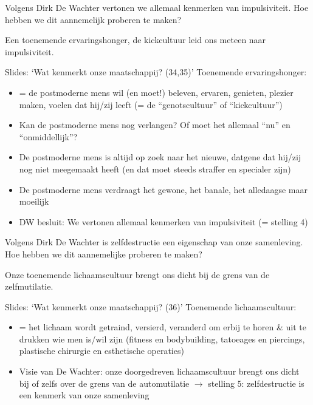 \documentclass[main.tex]{subfiles}
\begin{document}
\begin{examenvraag}
    \begin{vraag}
        Volgens Dirk De Wachter vertonen we allemaal kenmerken van impulsiviteit. Hoe hebben we dit aannemelijk proberen te maken?
    \end{vraag}

    \begin{antwoord}
        Een toenemende ervaringshonger, de kickcultuur leid ons meteen naar impulsiviteit.
        \begin{citaat}{Slides: `Wat kenmerkt onze maatschappij? (34,35)'}
            Toenemende ervaringshonger:
            \begin{itemize}
                \item = de postmoderne mens wil (en moet!) beleven, ervaren, genieten, plezier maken, voelen dat hij/zij leeft (= de “genotscultuur” of “kickcultuur”)
                \item Kan de postmoderne mens nog verlangen? Of moet het allemaal “nu” en “onmiddellijk”?
                \item De postmoderne mens is altijd op zoek naar het nieuwe, datgene dat hij/zij nog niet meegemaakt heeft (en dat moet steeds straffer en specialer zijn)
                \item De postmoderne mens verdraagt het gewone, het banale, het alledaagse maar moeilijk
                \item DW besluit: We vertonen allemaal kenmerken van impulsiviteit (= stelling 4)
            \end{itemize}
        \end{citaat}
    \end{antwoord}
\end{examenvraag}


\begin{examenvraag}
    \begin{vraag}
        Volgens Dirk De Wachter is zelfdestructie een eigenschap van onze samenleving. Hoe hebben we dit aannemelijke proberen te maken?
    \end{vraag}

    \begin{antwoord}
        Onze toenemende lichaamscultuur brengt ons dicht bij de grens van de zelfmutilatie.
        \begin{citaat}{Slides: `Wat kenmerkt onze maatschappij? (36)'}
            Toenemende lichaamscultuur:
            \begin{itemize}
                \item = het lichaam wordt getraind, versierd, veranderd om erbij te horen \& uit te drukken wie men is/wil zijn (fitness en bodybuilding, tatoeages en piercings, plastische chirurgie en esthetische operaties)
                \item Visie van De Wachter: onze doorgedreven lichaamscultuur brengt ons dicht bij of zelfs over de grens van de automutilatie $\rightarrow$ stelling 5: zelfdestructie is een kenmerk van onze samenleving
            \end{itemize}
        \end{citaat}
    \end{antwoord}
\end{examenvraag}
\end{document}
